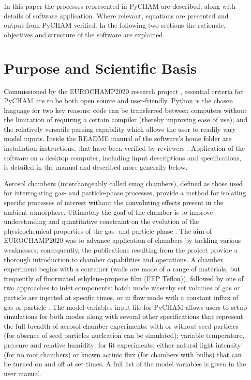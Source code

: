 \documentclass[gmd, manuscript]{copernicus}
\begin{document}
In this paper the processes represented in PyCHAM are described, along with details of software application.  Where relevant, equations are presented and output from PyCHAM verified.  In the following two sections the rationale, objectives and structure of the software are explained.

\section{Purpose and Scientific Basis}\label{sec:purp}

Commissioned by the EUROCHAMP2020 research project \citep{EUROCHAMP2020}, essential criteria for PyCHAM are to be both open source and user-friendly.  Python is the chosen language for two key reasons: code can be transferred between computers without the limitation of requiring a certain compiler (thereby improving ease of use), and the relatively versatile parsing capability which allows the user to readily vary model inputs.  Inside the README manual of the software's home folder are installation instructions, that have been verified by reviewers \citep{OMeara2020}.  Application of the software on a desktop computer, including input descriptions and specifications, is detailed in the manual and described more generally below.  

Aerosol chambers (interchangeably called smog chambers), defined as those used for interrogating gas- and particle-phase processes, provide a method for isolating specific processes of interest without the convoluting effects present in the ambient atmosphere.  Ultimately the goal of the chamber is to improve understanding and quantitative constraint on the evolution of the physicochemical properties of the gas- and particle-phase \citep{Schwantes2017, Charan2019, Hidy2019}.  The aim of EUROCHAMP2020 was to advance application of chambers by tackling various weaknesses; consequently, the publications \citep{EUROCHAMP2020} resulting from the project provide a thorough introduction to chamber capabilities and operations.  A chamber experiment begins with a container (walls are made of a range of materials, but frequently of fluorinated ethylene-propene film (FEP Teflon)), followed by one of two approaches to inlet components: batch mode whereby set volumes of gas or particle are injected at specific times, or in flow mode with a constant influx of gas or particle \citep{Jaoui2014}.  The model variables input file for PyCHAM allows users to setup simulations for both modes along with several other specifications that represent the full breadth of aerosol chamber experiments: with or without seed particles (for absence of seed particles nucleation can be simulated); variable temperature, pressure and relative humidity; for lit experiments, either natural light intensity (for no roof chambers) or known actinic flux (for chambers with bulbs) that can be turned on and off at set times.  A full list of the model variables is given in the user manual.
\end{document}
